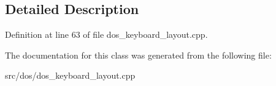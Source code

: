 \subsection{Detailed Description}


Definition at line 63 of file dos\-\_\-keyboard\-\_\-layout.\-cpp.



The documentation for this class was generated from the following file\-:\begin{DoxyCompactItemize}
\item 
src/dos/dos\-\_\-keyboard\-\_\-layout.\-cpp\end{DoxyCompactItemize}
